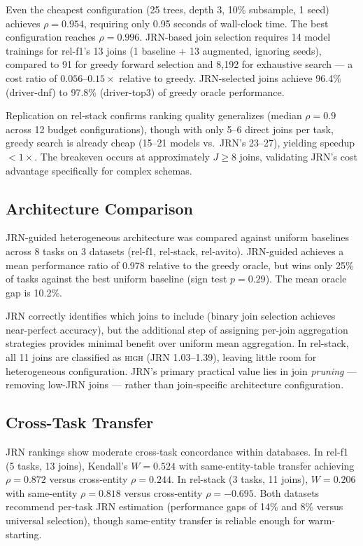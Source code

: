 \documentclass[11pt,letterpaper]{article}
\begin{document}
Even the cheapest configuration (25 trees, depth 3, 10\% subsample, 1 seed) achieves $\rho = 0.954$, requiring only 0.95 seconds of wall-clock time. The best configuration reaches $\rho = 0.996$. JRN-based join selection requires 14 model trainings for rel-f1's 13 joins (1 baseline + 13 augmented, ignoring seeds), compared to 91 for greedy forward selection and 8,192 for exhaustive search --- a cost ratio of $0.056$--$0.15\times$ relative to greedy. JRN-selected joins achieve 96.4\% (driver-dnf) to 97.8\% (driver-top3) of greedy oracle performance.

Replication on rel-stack confirms ranking quality generalizes (median $\rho = 0.9$ across 12 budget configurations), though with only 5--6 direct joins per task, greedy search is already cheap (15--21 models vs.\ JRN's 23--27), yielding speedup $< 1\times$. The breakeven occurs at approximately $J \geq 8$ joins, validating JRN's cost advantage specifically for complex schemas.

\subsection{Architecture Comparison}
\label{sec:architecture}

JRN-guided heterogeneous architecture was compared against uniform baselines across 8 tasks on 3 datasets (rel-f1, rel-stack, rel-avito). JRN-guided achieves a mean performance ratio of 0.978 relative to the greedy oracle, but wins only 25\% of tasks against the best uniform baseline (sign test $p = 0.29$). The mean oracle gap is 10.2\%.

JRN correctly identifies which joins to include (binary join selection achieves near-perfect accuracy), but the additional step of assigning per-join aggregation strategies provides minimal benefit over uniform mean aggregation. In rel-stack, all 11 joins are classified as \textsc{high} (JRN 1.03--1.39), leaving little room for heterogeneous configuration. JRN's primary practical value lies in join \emph{pruning} --- removing low-JRN joins --- rather than join-specific architecture configuration.

\subsection{Cross-Task Transfer}
\label{sec:transfer}

JRN rankings show moderate cross-task concordance within databases. In rel-f1 (5 tasks, 13 joins), Kendall's $W = 0.524$ with same-entity-table transfer achieving $\rho = 0.872$ versus cross-entity $\rho = 0.244$. In rel-stack (3 tasks, 11 joins), $W = 0.206$ with same-entity $\rho = 0.818$ versus cross-entity $\rho = -0.695$. Both datasets recommend per-task JRN estimation (performance gaps of 14\% and 8\% versus universal selection), though same-entity transfer is reliable enough for warm-starting.
\end{document}
